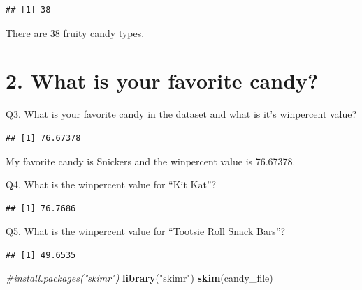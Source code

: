 \documentclass[
]{article}
\newenvironment{Shaded}{\begin{snugshade}}{\end{snugshade}}
\newcommand{\CommentTok}[1]{\textcolor[rgb]{0.56,0.35,0.01}{\textit{#1}}}
\newcommand{\DecValTok}[1]{\textcolor[rgb]{0.00,0.00,0.81}{#1}}
\newcommand{\FunctionTok}[1]{\textcolor[rgb]{0.13,0.29,0.53}{\textbf{#1}}}
\newcommand{\NormalTok}[1]{#1}
\newcommand{\SpecialCharTok}[1]{\textcolor[rgb]{0.81,0.36,0.00}{\textbf{#1}}}
\newcommand{\StringTok}[1]{\textcolor[rgb]{0.31,0.60,0.02}{#1}}
\begin{document}
\begin{verbatim}
## [1] 38
\end{verbatim}

There are 38 fruity candy types.

\hypertarget{what-is-your-favorite-candy}{%
\section{2. What is your favorite
candy?}\label{what-is-your-favorite-candy}}

Q3. What is your favorite candy in the dataset and what is it's
winpercent value?

\begin{Shaded}
\end{Shaded}

\begin{verbatim}
## [1] 76.67378
\end{verbatim}

My favorite candy is Snickers and the winpercent value is 76.67378.

Q4. What is the winpercent value for ``Kit Kat''?

\begin{Shaded}
\end{Shaded}

\begin{verbatim}
## [1] 76.7686
\end{verbatim}

Q5. What is the winpercent value for ``Tootsie Roll Snack Bars''?

\begin{Shaded}
\end{Shaded}

\begin{verbatim}
## [1] 49.6535
\end{verbatim}

\begin{Shaded}
\begin{Highlighting}[]
\CommentTok{\#install.packages("skimr")}
\FunctionTok{library}\NormalTok{(}\StringTok{"skimr"}\NormalTok{)}
\FunctionTok{skim}\NormalTok{(candy\_file)}
\end{Highlighting}
\end{Shaded}
\end{document}
